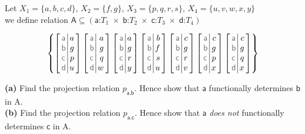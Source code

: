 \begin{example}
Let $X_1 = \{a,b,c,d\}$, $X_2 = \{f,g\}$, $X_3 = \{p,q,r,s\}$, $X_4 = \{u,v,w,x,y\}$\\
we define relation 
$\textsf{A} \subseteq (\textsf{a}\text{:}T_1 \;\times\; 
\textsf{b}\text{:}T_2 \;\times\; 
\textsf{c}\text{:}T_3 \;\times\; 
\textsf{d}\text{:}T_4)$ 

$$
\arraycolsep=2pt
\left\{
\ratuple {
    \textsf{a} & a \\
    \textsf{b} & g \\
    \textsf{c} & p \\
    \textsf{d} & u \\
}
\ratuple {
    \textsf{a} & a \\
    \textsf{b} & g \\
    \textsf{c} & q \\
    \textsf{d} & w \\
}
\ratuple {
    \textsf{a} & a \\
    \textsf{b} & g \\
    \textsf{c} & r \\
    \textsf{d} & y \\
}
\ratuple {
    \textsf{a} & b \\
    \textsf{b} & f \\
    \textsf{c} & s \\
    \textsf{d} & u \\
}
\ratuple {
    \textsf{a} & c \\
    \textsf{b} & g \\
    \textsf{c} & r \\
    \textsf{d} & v \\
}
\ratuple {
    \textsf{a} & c \\
    \textsf{b} & g \\
    \textsf{c} & p \\
    \textsf{d} & x \\
}
\ratuple {
    \textsf{a} & c \\
    \textsf{b} & g \\
    \textsf{c} & q \\
    \textsf{d} & x \\
}
\right\}
$$

\textbf{(a)} Find the projection relation $p_{\textsf{a},\textsf{b}}$. 
Hence show that $\textsf{a}$ functionally determines $\textsf{b}$ in \textsf{A}.\\
\textbf{(b)} Find the projection relation $p_{\textsf{a},\textsf{c}}$. 
Hence show that $\textsf{a}$ \textit{does not} functionally determines $\textsf{c}$ in \textsf{A}.
\end{example}



